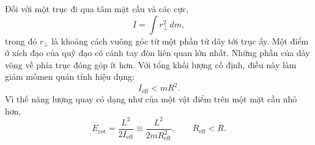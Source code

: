 Đối với một trục đi qua tâm mặt cầu và các cực,
\begin{equation}
  I=\int r_\perp^2\,dm,
  \label{eq:l09-extended-inertia}
\end{equation}
trong đó \(r_\perp\) là khoảng cách vuông góc từ một phần tử dây tới trục ấy. Một điểm ở xích đạo của quỹ đạo có cánh tay đòn liên quan lớn nhất. Những phần của dây võng về phía trục đóng góp ít hơn. Với tổng khối lượng cố định, điều này làm giảm mômen quán tính hiệu dụng:
\begin{equation}
  I_{\mathrm{eff}}<mR^2.
  \label{eq:l09-inertia-reduction}
\end{equation}
Vì thế năng lượng quay có dạng như của một vật điểm trên một mặt cầu nhỏ hơn,
\begin{equation}
  E_{\mathrm{rot}}
  =\frac{L^2}{2I_{\mathrm{eff}}}
  \equiv \frac{L^2}{2mR_{\mathrm{eff}}^2},
  \qquad R_{\mathrm{eff}}<R.
  \label{eq:l09-effective-radius}
\end{equation}

\begin{classroomqa}
\end{classroomqa}

